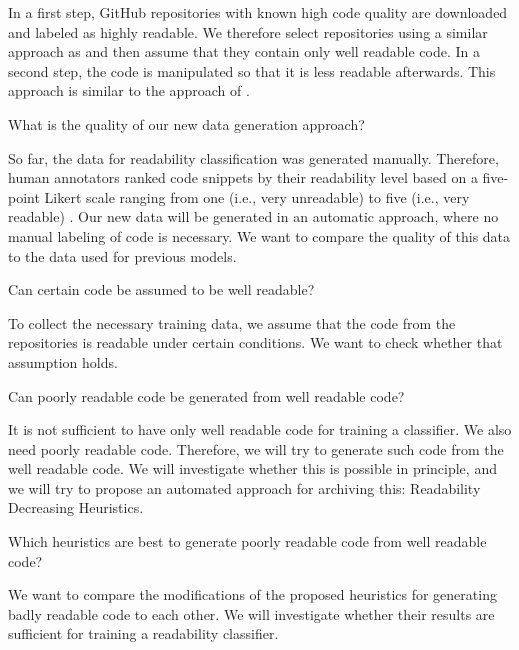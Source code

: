 \documentclass[%
class=scrreprt,
chapterprefix=false,%
open=right,%
twoside=false,%
paper=a4,%
logofile={Logo\_zentral\_farbig\_EN.png},%
thesistype=masterproposal,%
UKenglish,%
]{se2thesis}
\begin{document}
	In a first step, GitHub repositories with known high code quality are downloaded and labeled as highly readable. We therefore select repositories using a similar approach as \citeauthor{allamanis2016convolutional} \cite{allamanis2016convolutional} and then assume that they contain only well readable code.
	In a second step, the code is manipulated so that it is less readable afterwards. This approach is similar to the approach of \citeauthor{loriot2022styler} \cite{loriot2022styler}.
	
	\begin{resq}What is the quality of our new data generation approach?\end{resq} \label{RQ1}
	So far, the data for readability classification was generated manually. Therefore, human annotators ranked code snippets by their readability level based on a five-point Likert scale \cite{likert1932technique} ranging from one (i.e., very unreadable) to five (i.e., very readable) \cite{buse2009learning, dorn2012general, scalabrino2016improving}. Our new data will be generated in an automatic approach, where no manual labeling of code is necessary. We want to compare the quality of this data to the data used for previous models.
	
	\begin{resq}Can certain code be assumed to be well readable?\end{resq} \label{RQ1.1}
	To collect the necessary training data, we assume that the code from the repositories is readable under certain conditions. We want to check whether that assumption holds.
	
	\begin{resq}Can poorly readable code be generated from well readable code?\end{resq} \label{RQ1.2}
	It is not sufficient to have only well readable code for training a classifier. We also need poorly readable code. Therefore, we will try to generate such code from the well readable code. We will investigate whether this is possible in principle, and we will try to propose an automated approach for archiving this: Readability Decreasing Heuristics.
	
	\begin{resq}Which heuristics are best to generate poorly readable code from well readable code?\end{resq}
	We want to compare the modifications of the proposed heuristics for generating badly readable code to each other. We will investigate whether their results are sufficient for training a readability classifier.
	
\end{document}
